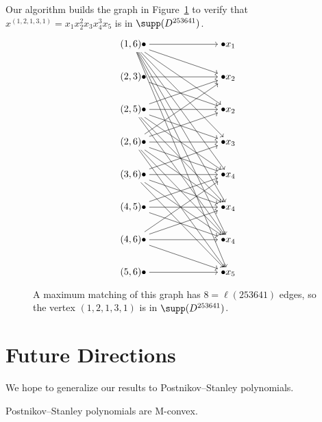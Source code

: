 \begin{exam}
Our algorithm builds the graph in Figure~\ref{fig:vanish} to verify that $x^{(1,2,1,3,1)} = x_1x_2^2x_3x_4^3x_5$ is in $\supp(D^{253641})$.
\end{exam}

    \begin{figure}[ht]

\[\begin{tikzcd}[cramped]
	{(1,6)\bullet} &&& {\bullet x_{1}} \\
	{(2,3)\bullet} &&& {\bullet x_{2}} \\
	{(2,5)\bullet} &&& {\bullet x_{2}} \\
	{(2,6)\bullet} &&& {\bullet x_{3}} \\
	{(3,6)\bullet} &&& {\bullet x_{4}} \\
	{(4,5)\bullet} &&& {\bullet x_{4}} \\
	{(4,6)\bullet} &&& {\bullet x_{4}} \\
	{(5,6)\bullet} &&& {\bullet x_{5}}
	\arrow[from=1-1, to=1-4]
	\arrow[from=1-1, to=2-4]
	\arrow[from=1-1, to=3-4]
	\arrow[from=1-1, to=4-4]
	\arrow[from=1-1, to=5-4]
	\arrow[from=1-1, to=6-4]
	\arrow[from=1-1, to=7-4]
	\arrow[from=1-1, to=8-4]
	\arrow[from=2-1, to=2-4]
	\arrow[from=2-1, to=3-4]
	\arrow[from=3-1, to=2-4]
	\arrow[from=3-1, to=3-4]
	\arrow[from=3-1, to=4-4]
	\arrow[from=3-1, to=5-4]
	\arrow[from=3-1, to=6-4]
	\arrow[from=3-1, to=7-4]
	\arrow[from=4-1, to=2-4]
	\arrow[from=4-1, to=3-4]
	\arrow[from=4-1, to=4-4]
	\arrow[from=4-1, to=5-4]
	\arrow[from=4-1, to=6-4]
	\arrow[from=4-1, to=7-4]
	\arrow[from=4-1, to=8-4]
	\arrow[from=5-1, to=4-4]
	\arrow[from=5-1, to=5-4]
	\arrow[from=5-1, to=6-4]
	\arrow[from=5-1, to=7-4]
	\arrow[from=5-1, to=8-4]
	\arrow[from=6-1, to=5-4]
	\arrow[from=6-1, to=6-4]
	\arrow[from=6-1, to=7-4]
	\arrow[from=7-1, to=5-4]
	\arrow[from=7-1, to=6-4]
	\arrow[from=7-1, to=7-4]
	\arrow[from=7-1, to=8-4]
	\arrow[from=8-1, to=8-4]
\end{tikzcd}\]

\caption{
    A maximum matching of this graph has $8 = \ell(253641)$ edges, so the vertex $(1,2,1,3,1)$ is in $\supp(D^{253641})$. 
}\label{fig:vanish}
\end{figure}


\section{Future Directions}
We hope to generalize our results to Postnikov--Stanley polynomials.
\begin{conjecture}
    Postnikov--Stanley polynomials are M-convex.
\end{conjecture}

